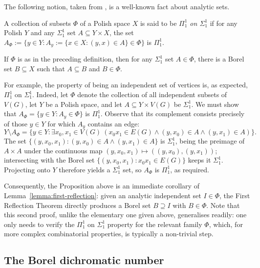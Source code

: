 The following notion, taken from \cite[Theorem~35.10, p.~285]{Kechris_1995_DescriptiveSetTheory}, is a well-known fact about analytic sets.

\begin{definition}\label{def:pi11-on-sigma11}
    A collection of subsets $\Phi$ of a Polish space $X$ is said to be \emph{$\Pi^1_1$ on $\Sigma^1_1$} if for any Polish $Y$ and any $\Sigma^1_1$ set $A\subseteq Y\times X$, the set $A_\Phi:=\{y\in Y:A_y:=\{x\in X:(y,x)\in A\}\in\Phi\}$ is $\Pi^1_1$.
\end{definition}

\begin{lemma}\label{lemma:first-reflection}
    If $\Phi$ is as in the preceding definition, then for any $\Sigma^1_1$ set $A\in\Phi$, there is a Borel set $B\subseteq X$ such that $A\subseteq B$ and $B\in\Phi$.
\end{lemma}

For example, the property of being an independent set of vertices is, as expected, $\Pi^1_1$ on $\Sigma^1_1$.
Indeed, let $\Phi$ denote the collection of all independent subsets of $V(G)$, let $Y$ be a Polish space, and let $A\subseteq Y\times V(G)$ be $\Sigma^1_1$.
We must show that $A_\Phi=\{y\in Y: A_y\in\Phi\}$ is $\Pi^1_1$.
Observe that its complement consists precisely of those $y\in Y$ for which $A_y$ contains an edge:
$$Y\setminus A_\Phi = \{y\in Y:\exists x_0,x_1\in V(G)\ (x_0x_1\in E(G)\wedge (y,x_0)\in A\wedge (y,x_1)\in A)\}.$$
The set $\{(y,x_0,x_1): (y,x_0)\in A\wedge (y,x_1)\in A\}$ is $\Sigma^1_1$, being the preimage of $A\times A$ under the continuous map $(y,x_0,x_1)\mapsto ((y,x_0),(y,x_1))$; intersecting with the Borel set $\{(y,x_0,x_1): x_0x_1\in E(G)\}$ keeps it $\Sigma^1_1$.
Projecting onto $Y$ therefore yields a $\Sigma^1_1$ set, so $A_\Phi$ is $\Pi^1_1$, as required.

Consequently, the Proposition above is an immediate corollary of Lemma~\ref{lemma:first-reflection}: given an analytic independent set $I\in\Phi$, the First Reflection Theorem directly produces a Borel set $B\supseteq I$ with $B\in\Phi$.
Note that this second proof, unlike the elementary one given above, generalises readily: one only needs to verify the $\Pi^1_1$ on $\Sigma^1_1$ property for the relevant family $\Phi$, which, for more complex combinatorial properties, is typically a non-trivial step.

\subsection{The Borel dichromatic number}

